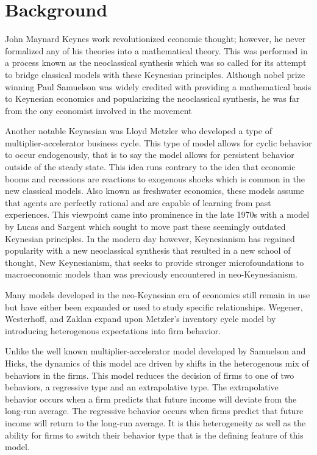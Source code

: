 \section{Background}
John Maynard Keynes work revolutionized economic thought; however, he never formalized any of his theories into a mathematical theory. This was performed in a process known as the neoclassical synthesis which was so called for its attempt to bridge classical models with these Keynesian principles. Although nobel prize winning Paul Samuelson was widely credited with providing a mathematical basis to Keynesian economics and popularizing the neoclassical synthesis, he was far from the ony economist involved in the movement\autocite{Skousen1997,Samuelson1939}

Another notable Keynesian was Lloyd Metzler who developed a type of multiplier-accelerator business cycle. This type of model allows for cyclic behavior to occur endogenously, that is to say the model allows for persistent behavior outside of the steady state. This idea runs contrary to the idea that economic booms and recessions are reactions to exogenous shocks which is common in the new classical models. Also known as freshwater economics, these models assume that agents are perfectly rational and are capable of learning from past experiences. This viewpoint came into prominence in the late 1970s with a model by Lucas and Sargent\autocite{Lucas1979} which sought to move past these seemingly outdated Keynesian principles. In the modern day however, Keynesianism has regained popularity with a new neoclassical synthesis that resulted in a new school of thought, New Keynesianism, that seeks to provide stronger microfoundations to macroeconomic models than was previously encountered in neo-Keynesianism. 

Many models developed in the neo-Keynesian era of economics still remain in use but have either been expanded or used to study specific relationships. Wegener, Westerhoff, and Zaklan expand upon Metzler's inventory cycle model by introducing heterogenous expectations into firm behavior\autocite{Wegener2009}. 

Unlike the well known multiplier-accelerator model developed by Samuelson and Hicks, the dynamics of this model are driven by shifts in the heterogenous mix of behaviors in the firms. This model reduces the decision of firms to one of two behaviors, a regressive type and an extrapolative type. The extrapolative behavior occurs when a firm predicts that future income will deviate from the long-run average. The regressive behavior occurs when firms predict that future income will return to the long-run average. It is this heterogeneity as well as the ability for firms to switch their behavior type that is the defining feature of this model. 

